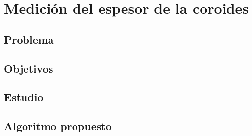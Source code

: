 \chapter{Medición del espesor de la coroides}
\section{Problema}
\section{Objetivos}
\section{Estudio}
\section{Algoritmo propuesto}
